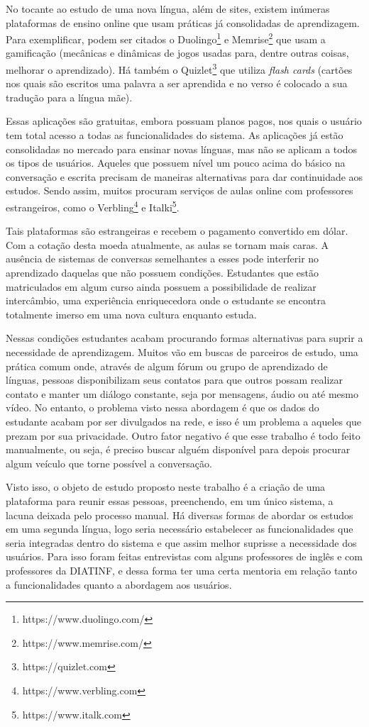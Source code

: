 No tocante ao estudo de uma nova língua, além de sites, existem inúmeras plataformas de ensino online que usam práticas já consolidadas de aprendizagem. Para exemplificar, podem ser citados o Duolingo\footnote{https://www.duolingo.com/} e Memrise\footnote{https://www.memrise.com/} que usam a gamificação (mecânicas e dinâmicas de jogos usadas para, dentre outras coisas, melhorar o aprendizado). Há também o Quizlet\footnote{https://quizlet.com} que utiliza \textit{flash cards} (cartões nos quais são escritos uma palavra a ser aprendida e no verso é colocado a sua tradução para a língua mãe).

Essas aplicações são gratuitas, embora possuam planos pagos, nos quais o usuário tem total acesso a todas as funcionalidades do sistema. As aplicações já estão consolidadas no mercado para ensinar novas línguas, mas não se aplicam a todos os tipos de usuários. Aqueles que possuem nível um pouco acima do básico na conversação e escrita precisam de maneiras alternativas para dar continuidade aos estudos. Sendo assim, muitos procuram serviços de aulas online com professores estrangeiros, como o Verbling\footnote{https://www.verbling.com} e Italki\footnote{https://www.italk.com}.

Tais plataformas são estrangeiras e recebem o pagamento convertido em dólar. Com a cotação desta moeda atualmente, as aulas se tornam mais caras. A ausência de sistemas de conversas semelhantes a esses pode interferir no aprendizado daquelas que não possuem condições. Estudantes que estão matriculados em algum curso ainda possuem a possibilidade de realizar intercâmbio, uma experiência enriquecedora onde o estudante se encontra totalmente imerso em uma nova cultura enquanto estuda.

Nessas condições estudantes acabam procurando formas alternativas para suprir a necessidade de aprendizagem. Muitos vão em buscas de parceiros de estudo, uma prática comum onde, através de algum fórum ou grupo de aprendizado de línguas, pessoas disponibilizam seus contatos para que outros possam realizar contato e manter um diálogo constante, seja por mensagens, áudio ou até mesmo vídeo. No entanto, o problema visto nessa abordagem é que os dados do estudante acabam por ser divulgados na rede, e isso é um problema a aqueles que prezam por sua privacidade. Outro fator negativo é que esse trabalho é todo feito manualmente, ou seja, é preciso buscar alguém disponível para depois procurar algum veículo que torne possível a conversação.

Visto isso, o objeto de estudo proposto neste trabalho é a criação de uma plataforma para reunir essas pessoas, preenchendo, em um único sistema, a lacuna deixada pelo processo manual. Há diversas formas de abordar os estudos em uma segunda língua, logo seria necessário estabelecer as funcionalidades que seria integradas dentro do sistema e que assim melhor suprisse a necessidade dos usuários. Para isso foram feitas entrevistas com alguns professores de inglês e com professores da DIATINF, e dessa forma ter uma certa mentoria em relação tanto a funcionalidades quanto a abordagem aos usuários. 

